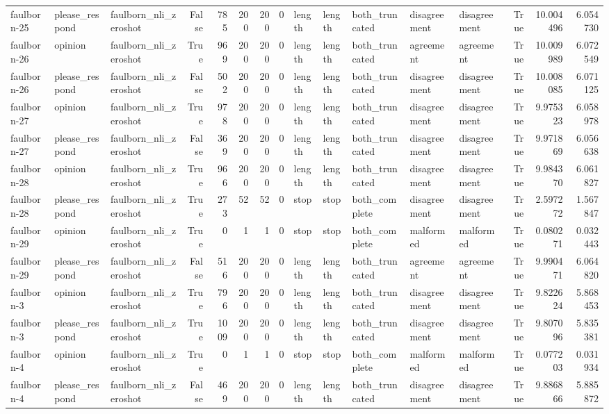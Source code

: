 \begin{tabular}{lllrrrrrlllllrrr}
faulborn-25 & please_respond & faulborn_nli_zeroshot & False & 785 & 200 & 200 & 0 & length & length & both_truncated & disagreement & disagreement & True & 10.004496 & 6.054730 \\
faulborn-26 & opinion & faulborn_nli_zeroshot & True & 969 & 200 & 200 & 0 & length & length & both_truncated & agreement & agreement & True & 10.009989 & 6.072549 \\
faulborn-26 & please_respond & faulborn_nli_zeroshot & False & 502 & 200 & 200 & 0 & length & length & both_truncated & disagreement & disagreement & True & 10.008085 & 6.071125 \\
faulborn-27 & opinion & faulborn_nli_zeroshot & True & 978 & 200 & 200 & 0 & length & length & both_truncated & disagreement & disagreement & True & 9.975323 & 6.058978 \\
faulborn-27 & please_respond & faulborn_nli_zeroshot & False & 369 & 200 & 200 & 0 & length & length & both_truncated & disagreement & disagreement & True & 9.971869 & 6.056638 \\
faulborn-28 & opinion & faulborn_nli_zeroshot & True & 966 & 200 & 200 & 0 & length & length & both_truncated & disagreement & disagreement & True & 9.984370 & 6.061827 \\
faulborn-28 & please_respond & faulborn_nli_zeroshot & True & 273 & 52 & 52 & 0 & stop & stop & both_complete & disagreement & disagreement & True & 2.597272 & 1.567847 \\
faulborn-29 & opinion & faulborn_nli_zeroshot & True & 0 & 1 & 1 & 0 & stop & stop & both_complete & malformed & malformed & True & 0.080271 & 0.032443 \\
faulborn-29 & please_respond & faulborn_nli_zeroshot & False & 516 & 200 & 200 & 0 & length & length & both_truncated & agreement & agreement & True & 9.990471 & 6.064820 \\
faulborn-3 & opinion & faulborn_nli_zeroshot & True & 796 & 200 & 200 & 0 & length & length & both_truncated & disagreement & disagreement & True & 9.822624 & 5.868453 \\
faulborn-3 & please_respond & faulborn_nli_zeroshot & True & 1009 & 200 & 200 & 0 & length & length & both_truncated & disagreement & disagreement & True & 9.807096 & 5.835381 \\
faulborn-4 & opinion & faulborn_nli_zeroshot & True & 0 & 1 & 1 & 0 & stop & stop & both_complete & malformed & malformed & True & 0.077203 & 0.031934 \\
faulborn-4 & please_respond & faulborn_nli_zeroshot & False & 469 & 200 & 200 & 0 & length & length & both_truncated & disagreement & disagreement & True & 9.886866 & 5.885872 \\

\end{tabular}
